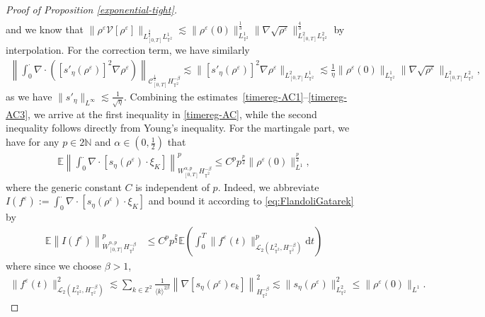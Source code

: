 \begin{proof}[Proof of Proposition \ref{exponential-tight}]
\begin{align*}
\end{align*}
and we know that $\|\rho^{\varepsilon} \mathcal{V}[\rho^{\varepsilon}]\|_{L^{\frac{3}{2}}_{[0,T]}L_{\mathbb{T}^2}^1} \lesssim  \|\rho^{\varepsilon}(0)\|_{L^1_{\mathbb{T}^2}}^{\frac{1}{3}}\|\nabla\sqrt{\rho^{\varepsilon}}\|_{L_{[0,T]}^2L^2_{\mathbb{T}^2}}^{\frac{4}{3}}$ by interpolation. For the correction term, we have similarly
\begin{align}\label{timereg-AC3}
\left\|\int_0^{\cdot}\nabla\cdot \left([s'_{\eta}(\rho^{\varepsilon})]^2\nabla\rho^{\varepsilon}\right)\right\|_{\mathcal{C}_{[0,T]}^{\frac{1}{2}} H_{\mathbb{T}^2}^{-\beta}} \lesssim \|[s'_{\eta}(\rho^{\varepsilon})]^2\nabla\rho^{\varepsilon}\|_{L_{[0,T]}^2L^1_{\mathbb{T}^2}} \lesssim \frac{1}{\eta}\|\rho^{\varepsilon}(0)\|_{L^1_{\mathbb{T}^2}}\|\nabla\sqrt{\rho^{\varepsilon}}\|_{L_{[0,T]}^2L^2_{\mathbb{T}^2}},
\end{align}
as we have $\|s'_{\eta}\|_{L^{\infty}} \lesssim \frac{1}{\sqrt{\eta}}$. Combining the estimates~\eqref{timereg-AC1}--\eqref{timereg-AC3}, we arrive at the first inequality in \eqref{timereg-AC}, while the second inequality follows directly from Young's inequality. For the martingale part, we have for any $p \in 2\mathbb{N}$ and $\alpha \in (0, \frac{1}{2})$ that 
\begin{align}\label{eq:timereg-MG}
\mathbb{E}\left\| \int_0^{\cdot} \nabla \cdot \left[s_{\eta}(\rho^{\varepsilon})  \cdot \xi_{K}\right]\right\|_{W_{[0,T]}^{\alpha,p}H_{\mathbb{T}^2}^{-\beta}}^p \leq  C^pp^{\frac{p}{2}} \|\rho^{\varepsilon}(0)\|^{\frac{p}{2}}_{L^1},
\end{align}
where the generic constant $C$ is independent of $p$. Indeed, we abbreviate $I(f^{\varepsilon}) := \int_0^{\cdot}  \nabla \cdot [s_{\eta}(\rho^{\varepsilon})  \cdot \xi_{K}]$ and bound it according to \eqref{eq:FlandoliGatarek} by
\begin{align}
\mathbb{E}\left\| I(f^{\varepsilon})\right\|_{\dot{W}_{[0,T]}^{\alpha,p}H^{-\beta}_{\mathbb{T}^2} }^p 
& \leq C^p p^{\frac{p}{2}}  \mathbb{E} \left( \int_0^T \|f^{\varepsilon}(t)\|_{\mathcal{L}_2(L_{\mathbb{T}^2}^2,H_{\mathbb{T}^2}^{-\beta})}^p \mathrm{d}t\right) 
\end{align}
where since we choose $\beta > 1$, 
\begin{align*}
\|f^{\varepsilon}(t)\|^2_{\mathcal{L}_2(L_{\mathbb{T}^2}^2,H_{\mathbb{T}^2}^{-\beta})} \lesssim \sum_{k \in \mathbb{Z}^2} \frac{1}{\langle k \rangle^{2\beta}}  \left \| \nabla \left[s_{\eta}(\rho^{\varepsilon}) e_k\right] \right\|_{H_{\mathbb{T}^2}^{-\beta}}^2 \lesssim \|s_{\eta}(\rho^{\varepsilon}) \|^2_{L_{\mathbb{T}^2}^2} \leq \|\rho^{\varepsilon}(0)\|_{L^1}.

\end{align*}
\end{proof}
